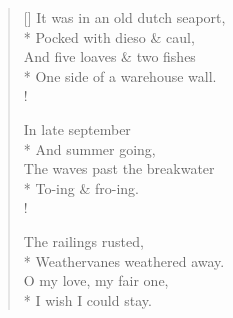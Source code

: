 \settowidth{\versewidth}{It was in an old dutch seaport}
\begin{verse}[\versewidth]
It was in an old dutch seaport,\\*
\vin Pocked with dieso \& caul,\\
And five loaves \& two fishes\\*
\vin One side of a warehouse wall.\\!

In late september\\*
\vin And summer going,\\
The waves past the breakwater\\*
\vin To-ing \& fro-ing.\\!

The railings rusted,\\*
\vin Weathervanes weathered away.\\
O my love, my fair one,\\*
\vin I wish I could stay.
\end{verse}

